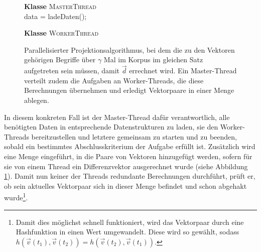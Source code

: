 \begin{figure}[h]
  \centering
  \begin{algorithm}[H]
    \BlankLine
    \textbf{Klasse} \textsc{MasterThread} \\
      data = ladeDaten();\\

    \BlankLine
    \textbf{Klasse} \textsc{WorkerThread} \\
  \end{algorithm}
  \caption[Parallelisierter Projektionsalgorithmus]{Parallelisierter Projektionsalgorithmus, bei dem die zu den Vektoren gehörigen
  Begriffe über $\gamma$ Mal im Korpus im gleichen Satz aufgetreten sein müssen, damit $\vec{d}$ errechnet wird. Ein Master-Thread
  verteilt zudem die Aufgaben an Worker-Threads, die diese Berechnungen übernehmen und erledigt Vektorpaare in einer Menge ablegen.
  \label{fig:algo3}}
\end{figure}

In diesem konkreten Fall ist der Master-Thread dafür verantwortlich, alle benötigten Daten in entsprechende Datenstrukturen
zu laden, sie den Worker-Threads bereitzustellen und letztere gemeinsam zu starten und zu beenden, sobald ein bestimmtes
Abschlusskriterium der Aufgabe erfüllt ist.
Zusätzlich wird eine Menge eingeführt, in die Paare von Vektoren hinzugefügt werden, sofern für sie von einem Thread
ein Differenzvektor ausgerechnet wurde (siehe Abbildung \ref{fig:algo3}). Damit nun keiner der Threads redundante Berechnungen durchführt, prüft er, ob sein
aktuelles Vektorpaar sich in dieser Menge befindet und schon abgehakt wurde\footnote{Damit dies möglichst schnell funktioniert,
wird das Vektorpaar durch eine Hashfunktion in einen Wert umgewandelt. Diese wird so gewählt,
sodass $h(\vec{v}(t_1), \vec{v}(t_2)) = h(\vec{v}(t_2), \vec{v}(t_1))$.}.\\


